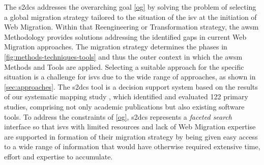 The \gls{s2dcs} addresses the overarching goal \cref{og} by solving the problem of selecting a global migration strategy tailored to the situation of the \gls{isv} at the initiation of \gls{Web Migration}.
Within that \gls{Reengineering} or \gls{Transformation} strategy, the \gls{awsm} Methodology provides solutions addressing the identified gaps in current \gls{Web Migration} approaches.
The migration strategy determines the phases in \cref{fig:methods-techniques-tools} and thus the outer context in which the \gls{awsm} Methods and Tools are applied.
Selecting a suitable approach for the specific situation is a challenge for \glspl{isv} due to the wide range of approaches, as shown in \cref{sec:approaches}.
The \gls{s2dcs} tool is a decision support system based on the results of our systematic mapping study \autocite{Heil2017Survey}, which identified and evaluated 122 primary studies, comprising not only academic publications but also existing software tools.
To address the constraints of \cref{og}, \gls{s2dcs} represents a \emph{faceted search} interface \autocite{Tunkelang2009FacetedSearch} so that \glspl{isv} with limited resources and lack of \gls{Web Migration} expertise are supported in formation of their migration strategy by being given easy access to a wide range of information that would have otherwise required extensive time, effort and expertise to accumulate.

